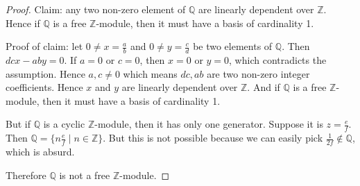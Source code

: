 \documentclass[11pt, a4paper]{report}
\begin{document}
\begin{proof}
    Claim: any two non-zero element of $\mathbb{Q}$ are linearly dependent over
    $\mathbb{Z}$. Hence if $\mathbb{Q}$ is a free $\mathbb{Z}$-module, then it must have a
    basis of cardinality 1.

    Proof of claim: let $0 \neq x = \frac{a}{b}$ and $0 \neq y =\frac{c}{d}$ be two
    elements of $\mathbb{Q}$. Then $dcx - aby=0$. If $a=0$ or $c=0$, then $x=0$ or $y=0$,
    which contradicts the assumption. Hence $a, c \neq 0$ which means $dc,ab$ are two
    non-zero integer coefficients. Hence $x$ and $y$ are linearly dependent over
    $\mathbb{Z}$. And if $\mathbb{Q}$ is a free $\mathbb{Z}$-module, then it must have a
    basis of cardinality 1.

    But if $\mathbb{Q}$ is a cyclic $\mathbb{Z}$-module, then it has only one generator.
    Suppose it is $z=\frac{e}{f}$. Then $\mathbb{Q}=\{n \frac{e}{f} \mid n \in \mathbb{Z}\}$.
    But this is not possible because we can easily pick $\frac{1}{2f} \notin \mathbb{Q}$,
    which is absurd.

    Therefore $\mathbb{Q}$ is not a free $\mathbb{Z}$-module.
\end{proof}
\end{document}
